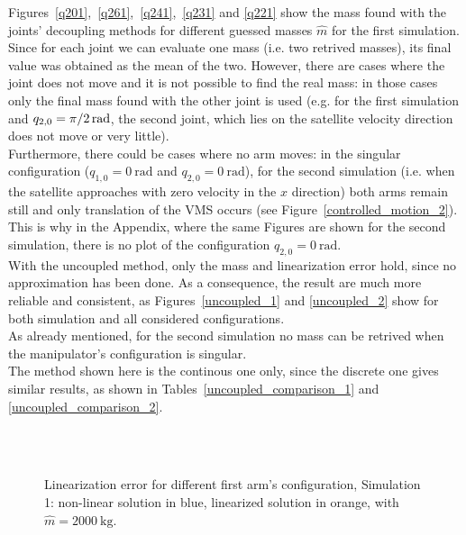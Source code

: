 \documentclass[a4paper,12pt,oneside]{report}
\begin{document}
Figures~\ref{q201},~\ref{q261},~\ref{q241},~\ref{q231} and \ref{q221} show the mass found with the joints' decoupling methods for different guessed masses $\hat{m}$ for the first simulation. Since for each joint we can evaluate one mass (i.e. two retrived masses), its final value was obtained as the mean of the two. However, there are cases where the joint does not move and it is not possible to find the real mass: in those cases only the final mass found with the other joint is used (e.g. for the first simulation and $q_{2,0}=\SI[parse-numbers = false]{\pi/2}{\radian}$, the second joint, which lies on the satellite velocity direction does not move or very little).\\
Furthermore, there could be cases where no arm moves: in the singular configuration ($q_{1,0}=\SI{0}{\radian}$ and $q_{2,0}=\SI{0}{\radian}$), for the second simulation (i.e. when the satellite approaches with zero velocity in the $x$ direction) both arms remain still and only translation of the VMS occurs (see Figure~\ref{controlled_motion_2}). This is why in the Appendix, where the same Figures are shown for the second simulation, there is no plot of the configuration $q_{2,0}=\SI{0}{\radian}$.\\
With the uncoupled method, only the mass and linearization error hold, since no approximation has been done. As a consequence, the result are much more reliable and consistent, as Figures~\ref{uncoupled_1} and \ref{uncoupled_2} show for both simulation and all considered configurations.\\
As already mentioned, for the second simulation no mass can be retrived when the manipulator's configuration is singular.\\
The method shown here is the continous one only, since the discrete one gives similar results, as shown in Tables~\ref{uncoupled_comparison_1} and \ref{uncoupled_comparison_2}.
\begin{figure}[h]
  \centering
  \subfloat[\emph{$q_{2,0}=\SI{0}{\radian}$}]{} \quad
  \subfloat[\emph{$q_{2,0}=\SI[parse-numbers = false]{\pi/6}{\radian}$}]{}\\
  \subfloat[\emph{$q_{2,0}=\SI[parse-numbers = false]{\pi/4}{\radian}$}]{}\quad
  \subfloat[\emph{$q_{2,0}=\SI[parse-numbers = false]{\pi/3}{\radian}$}]{}\\
  \subfloat[\emph{$q_{2,0}=\SI[parse-numbers = false]{\pi/2}{\radian}$}]{}
  \caption{Linearization error for different first arm's configuration, Simulation 1: non-linear solution in blue, linearized solution in orange, with $\hat{m}=\SI{2000}{\kilogram}$.}
  \label{linear_error_1}
\end{figure}
\end{document}
